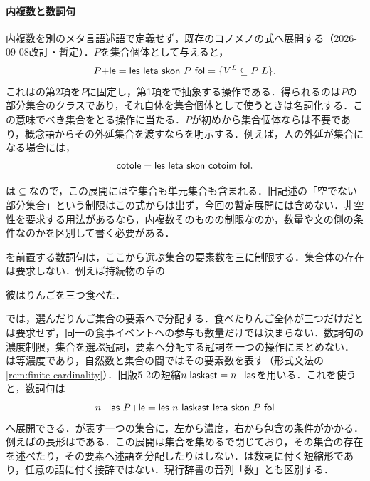 \documentclass[../../main-detail.tex]{subfiles}
\begin{document}
\paragraph{内複数と数詞句}\label{par:counted-plural}
内複数を別のメタ言語述語で定義せず，既存のコノメノの式へ展開する（2026-09-08改訂・暫定）．$P$を集合個体として与えると，
\[
 \textsf{$P$+le}=\textsf{les leta skon $P$ fol}
 =\{V^L\mathrel{\subseteq}P\;L\}.
\]
これはの第2項を$P$に固定し，第1項をで抽象する操作である．得られるのは$P$の部分集合のクラスであり，それ自体を集合個体として使うときは名詞化する．この意味でべき集合をとる操作に当たる．$P$が初めから集合個体ならは不要であり，概念語からその外延集合を渡すならを明示する．例えば，人の外延が集合になる場合には，
\[
 \textsf{cotole}=\textsf{les leta skon cotoim fol}.
\]

\begin{remark}[空集合]
は$\subseteq$なので，この展開には空集合も単元集合も含まれる．旧記述の「空でない部分集合」という制限はこの式からは出ず，今回の暫定展開には含めない．非空性を要求する用法があるなら，内複数そのものの制限なのか，数量や文の側の条件なのかを区別して書く必要がある．
\end{remark}

を前置する数詞句は，ここから選ぶ集合の要素数を三に制限する．集合体の存在は要求しない．例えば持続物の章の
\begin{exe}
 \ex {}
 \glt 彼はりんごを三つ食べた．
\end{exe}
では，選んだりんご集合の要素へで分配する．食べたりんご全体が三つだけだとは要求せず，同一の食事イベントへの参与も数量だけでは決まらない．数詞句の濃度制限，集合を選ぶ冠詞，要素へ分配する冠詞を一つの操作にまとめない．
は等濃度であり，自然数と集合の間ではその要素数を表す（形式文法の\ref{rem:finite-cardinality}）．旧版5-2の短縮$n\;\textsf{laskast}=\textsf{$n$+las}$を用いる．これを使うと，数詞句は
\[
 \textsf{$n$+las $P$+le}
 =\textsf{les $n$ laskast leta skon $P$ fol}
\]
へ展開できる．が表す一つの集合に，左から濃度，右から包含の条件がかかる．例えばの長形はである．この展開は集合を集めるで閉じており，その集合の存在を述べたり，その要素へ述語を分配したりはしない．は数詞に付く短縮形であり，任意の語に付く接辞ではない．現行辞書の音列「数」とも区別する．
\end{document}
